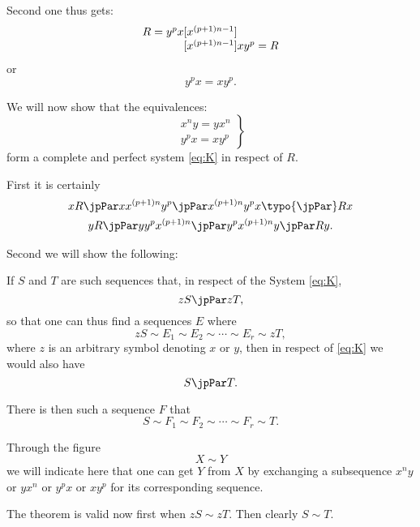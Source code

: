 Second one thus gets:
$$\begin{array}{r@{}c@{}l}
R = y^px & [x^{(p+1)n-1}] & \\
       & [x^{(p+1)n-1}] & xy^p = R
\end{array}$$
or
$$y^px = xy^p.$$

\UseKEquationNumbering
We will now show that the equivalences:
\begin{equation}
\left.\begin{array}{c}
x^ny = yx^n\\
y^px = xy^p
\end{array}\right\}
\label{eq:K}
\end{equation}
form a complete and perfect system \ref{eq:K} in respect of $R$.

\bigskip

First 
it is certainly
\begin{gather*}
xR \jpPar xx^{(p+1)n}y^p \jpPar x^{(p+1)n}y^px \typo{\jpPar} Rx\\
yR \jpPar yy^px^{(p+1)n} \jpPar y^px^{(p+1)n}y \jpPar Ry.\\
\end{gather*}

\smallskip
Second we will show the following:

If $S$ and $T$ are such sequences that, in respect of the System \ref{eq:K},
$$zS \jpPar zT,$$
so that one can thus find a sequences $E$ where
$$zS \sim E_1 \sim E_2 \sim \cdots \sim E_r \sim zT,$$
where $z$ is an arbitrary symbol denoting $x$ or $y$, then in respect
of  \ref{eq:K} we would also have
$$S \jpPar T.$$

There is then such a sequence $F$ that
$$S \sim F_1 \sim F_2 \sim \cdots \sim F_r \sim T.$$

Through the figure
$$X \sim Y$$
we will indicate here that one can get $Y$ from $X$ by exchanging a
subsequence $x^ny$ or $yx^n$ or $y^px$ or $xy^p$ for its corresponding
sequence.  

\bigskip

The theorem 
is valid now first when
$zS \sim zT.$
Then clearly
$S \sim T.$

